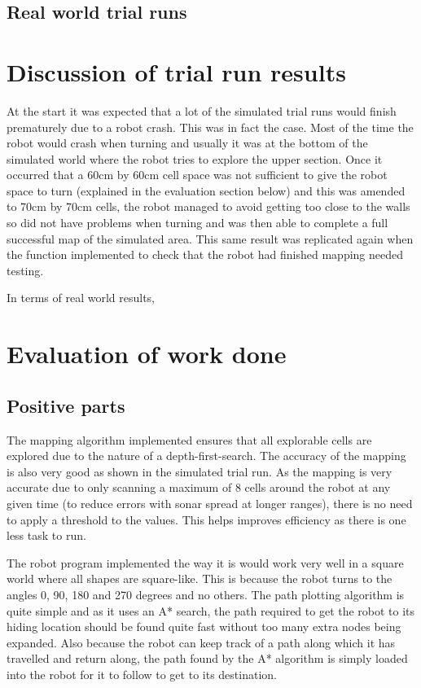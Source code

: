 \documentclass[a4paper,12pt]{article}
\begin{document}
\subsection{Real world trial runs}

\section{Discussion of trial run results}
\noindent At the start it was expected that a lot of the simulated trial runs would finish prematurely due to a robot crash. This was in fact the case. Most of the time the robot would crash when turning and usually it was at the bottom of the simulated world where the robot tries to explore the upper section. Once it occurred that a 60cm by 60cm cell space was not sufficient to give the robot space to turn (explained in the evaluation section below) and this was amended to 70cm by 70cm cells, the robot managed to avoid getting too close to the walls so did not have problems when turning and was then able to complete a full successful map of the simulated area. This same result was replicated again when the function implemented to check that the robot had finished mapping needed testing.

\vspace{5mm}
\noindent In terms of real world results, 

\section{Evaluation of work done}

\subsection{Positive parts}
\noindent The mapping algorithm implemented ensures that all explorable cells are explored due to the nature of a depth-first-search. The accuracy of the mapping is also very good as shown in the simulated trial run. As the mapping is very accurate due to only scanning a maximum of 8 cells around the robot at any given time (to reduce errors with sonar spread at longer ranges), there is no need to apply a threshold to the values. This helps improves efficiency as there is one less task to run.

\vspace{5mm}
\noindent The robot program implemented the way it is would work very well in a square world where all shapes are square-like. This is because the robot turns to the angles 0, 90, 180 and 270 degrees and no others. The path plotting algorithm is quite simple and as it uses an A* search, the path required to get the robot to its hiding location should be found quite fast without too many extra nodes being expanded. Also because the robot can keep track of a path along which it has travelled and return along, the path found by the A* algorithm is simply loaded into the robot for it to follow to get to its destination.
\end{document}
